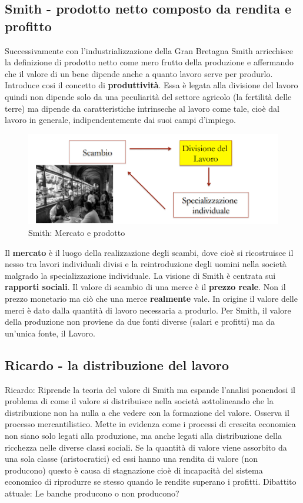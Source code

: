 \documentclass{article}
\begin{document}
\subsection{Smith -  prodotto netto composto da rendita e profitto}
Successivamente con l'industrializzazione della Gran Bretagna Smith arricchisce la definizione di prodotto netto come mero frutto della produzione e affermando che il valore di un bene dipende anche  a quanto lavoro serve per produrlo. 
Introduce cosi il concetto di \textbf{produttività}. Essa è legata alla divisione del lavoro quindi non dipende solo da una peculiarità del settore agricolo (la fertilità delle terre) ma dipende da caratteristiche
intrinseche al lavoro come tale, cioè dal lavoro in generale,
indipendentemente dai suoi campi d’impiego. 
\begin{figure}[h!]
\centering
\includegraphics[scale=0.3]{images/spec_lav.png}
\caption{Smith: Mercato e prodotto}
\label{fig:spec_lav}
\end{figure}
Il \textbf{mercato} è il luogo della realizzazione degli scambi, dove cioè si ricostruisce il
nesso tra lavori individuali divisi e la reintroduzione degli uomini nella società
malgrado la specializzazione individuale.
La visione di Smith è centrata sui \textbf{rapporti sociali}. 
Il valore di scambio di una merce è il \textbf{prezzo reale}. Non il prezzo
monetario ma ciò che una merce  \textbf{realmente} vale. In origine il valore delle
merci è dato dalla quantità di lavoro necessaria a produrlo.
Per Smith, il valore della produzione non proviene da due fonti diverse (salari e
profitti) ma da un’unica fonte, il Lavoro.
\subsection{Ricardo - la distribuzione del lavoro}
Ricardo: Riprende la teoria del valore di Smith ma espande l’analisi ponendosi il problema di come il valore si distribuisce nella società sottolineando che la distribuzione non ha
nulla a che vedere con la formazione del valore. 
 Osserva il processo mercantilistico. Mette in evidenza come i processi di crescita economica non siano solo legati alla produzione, ma anche legati alla distribuzione della ricchezza nelle diverse classi sociali. Se la quantità di valore viene assorbito da una sola classe (aristocratici) ed essi hanno una rendita di valore (non producono) questo  è causa di stagnazione cioè di incapacità del sistema economico di riprodurre se stesso quando le rendite superano i profitti. 
Dibattito attuale: Le banche producono o non producono?
\end{document}
